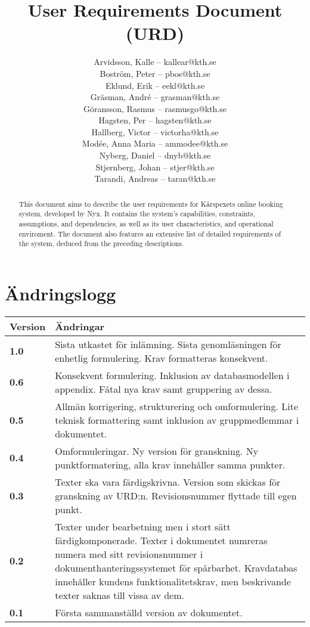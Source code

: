 \documentclass[a4paper, twoside, 11pt, titlepage]{article}
\author{
	\small
	Arvidsson, Kalle -- kallear@kth.se\\
	Boström, Peter -- pbos@kth.se\\
	Eklund, Erik -- eekl@kth.se\\
	Gräsman, André -- grasman@kth.se\\
	Göransson, Rasmus -- rasmusgo@kth.se\\
	Hagsten, Per -- hagsten@kth.se\\
	Hallberg, Victor -- victorha@kth.se\\
	Modée, Anna Maria -- ammodee@kth.se\\
	Nyberg, Daniel -- dnyb@kth.se\\
	Stjernberg, Johan -- stjer@kth.se\\
	Tarandi, Andreas -- taran@kth.se
	}
\title{User Requirements Document (URD)}
\begin{document}
\maketitle

\clearpage
\thispagestyle{empty}
\mbox{}
\newpage

\begin{abstract}
	This document aims to describe the user requirements for Kårspexets online booking system, developed by Nyx. It contains the system's capabilities, constraints, assumptions, and dependencies, as well as its user characteristics, and operational enviroment. The document also features an extensive list of detailed requirements of the system, deduced from the preceding descriptions.
\end{abstract}

\newpage

\tableofcontents

\clearpage
\setcounter{page}{1}

\startfooter

\clearpage
\section*{Ändringslogg}


\begin{tabular} { p{2.6cm} p{12.5cm} }
	\hline
	\sffamily\textbf{Version} & \sffamily\textbf{Ändringar } \\
	\hline
	\sffamily\textbf{1.0} & Sista utkastet för inlämning. Sista genomläsningen för enhetlig formulering. Krav formatteras konsekvent.  \\
	\hline
	\sffamily\textbf{0.6} & Konsekvent formulering. Inklusion av databasmodellen i appendix. Fåtal nya krav samt gruppering av dessa.  \\
	\hline
	\sffamily\textbf{0.5} & Allmän korrigering, strukturering och omformulering. Lite teknisk formattering samt inklusion av gruppmedlemmar i dokumentet.  \\
	\hline
	\sffamily\textbf{0.4} & Omformuleringar. Ny version för granskning. Ny punktformatering, alla krav innehåller samma punkter.  \\
	\hline
	\sffamily\textbf{0.3} & Texter ska vara färdigskrivna. Version som skickas för granskning av URD:n. Revisionsnummer flyttade till egen punkt.  \\
	\hline
	\sffamily\textbf{0.2} & Texter under bearbetning men i stort sätt färdigkomponerade. Texter i dokumentet numreras numera med sitt revisionsnummer i dokumenthanteringssystemet för spårbarhet. Kravdatabas innehåller kundens funktionalitetskrav, men beskrivande texter saknas till vissa av dem.  \\
	\hline
	\sffamily\textbf{0.1} & Första sammanställd version av dokumentet.  \\
	\hline
\end{tabular}
\end{document}
